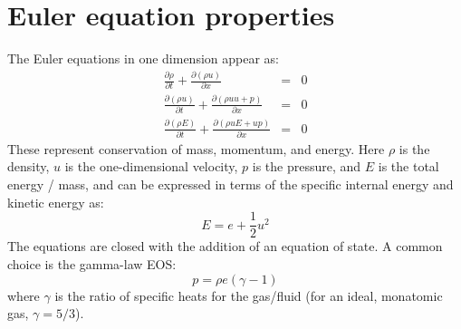 
\begin{quote}
\end{quote}

\section{Euler equation properties}

The Euler equations in one dimension appear as:
\begin{eqnarray}
\frac{\partial \rho}{\partial t} + 
    \frac{\partial (\rho u)}{\partial x} &=& 0 \\
%
\frac{\partial(\rho u)}{\partial t} +
    \frac{\partial (\rho uu + p)}{\partial x} &=& 0 \\
%
\frac{\partial(\rho E)}{\partial t} + 
    \frac{\partial(\rho u E + u p)}{\partial x} &=& 0
\end{eqnarray}
These represent conservation of mass, momentum, and energy.  Here $\rho$ is the
density, $u$ is the one-dimensional velocity, $p$ is the pressure, and $E$
is the total energy / mass, and can be expressed in terms of the
specific internal energy and kinetic energy as:
\begin{equation}
E = e + \frac{1}{2} u^2
\end{equation}
The equations are closed with the addition of an equation of state.  A common
choice is the gamma-law EOS:
\begin{equation}
p = \rho e(\gamma - 1)
\end{equation}
where $\gamma$ is the ratio of specific heats for the gas/fluid (for
an ideal, monatomic gas, $\gamma = 5/3$).

